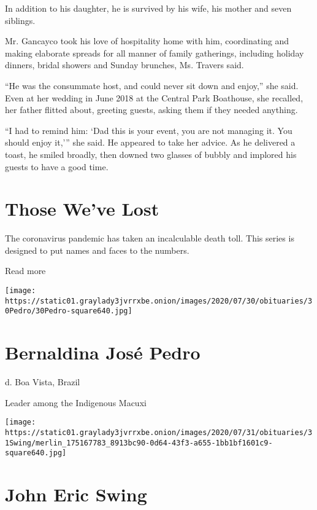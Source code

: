 In addition to his daughter, he is survived by his wife, his mother and
seven siblings.

Mr. Gancayco took his love of hospitality home with him, coordinating
and making elaborate spreads for all manner of family gatherings,
including holiday dinners, bridal showers and Sunday brunches, Ms.
Travers said.

``He was the consummate host, and could never sit down and enjoy,'' she
said. Even at her wedding in June 2018 at the Central Park Boathouse,
she recalled, her father flitted about, greeting guests, asking them if
they needed anything.

``I had to remind him: `Dad this is your event, you are not managing it.
You should enjoy it,''' she said. He appeared to take her advice. As he
delivered a toast, he smiled broadly, then downed two glasses of bubbly
and implored his guests to have a good time.

\href{https://www.nytimes3xbfgragh.onion/interactive/2020/obituaries/people-died-coronavirus-obituaries.html?action=click\&pgtype=Article\&state=default\&region=BELOW_MAIN_CONTENT\&context=covid_obits_promo}{}

\hypertarget{those-weve-lost}{%
\section{Those We've Lost}\label{those-weve-lost}}

The coronavirus pandemic has taken an incalculable death toll. This
series is designed to put names and faces to the numbers.

Read more

\texttt{[image: https://static01.graylady3jvrrxbe.onion/images/2020/07/30/obituaries/30Pedro/30Pedro-square640.jpg]}

\hypertarget{bernaldina-josuxe9-pedro}{%
\section{Bernaldina José Pedro}\label{bernaldina-josuxe9-pedro}}

d. Boa Vista, Brazil

Leader among the Indigenous Macuxi

\texttt{[image: https://static01.graylady3jvrrxbe.onion/images/2020/07/31/obituaries/31Swing/merlin\_175167783\_8913bc90-0d64-43f3-a655-1bb1bf1601c9-square640.jpg]}

\hypertarget{john-eric-swing}{%
\section{John Eric Swing}\label{john-eric-swing}}

